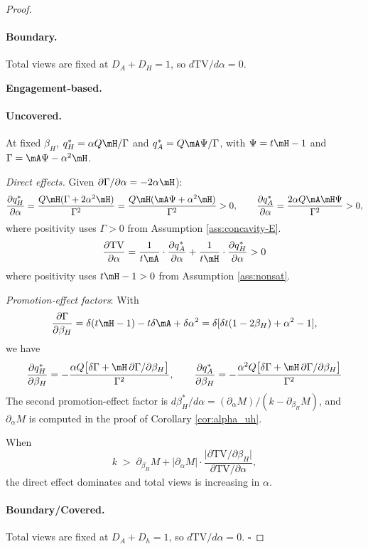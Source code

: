 \begin{proof}
\paragraph{Boundary.}\;
Total views are fixed at $D_A + D_H = 1$, so $d\text{TV}/d\alpha = 0$.



\medskip
\textbf{Engagement-based.}
\paragraph{Uncovered.}\;
At fixed $\beta_H$, $q_H^* = \alpha Q\mH/\Gamma$ and
$q_A^* = Q\mA\Psi/\Gamma$, with $\Psi = t\mH - 1$ and
$\Gamma = \mA\Psi - \alpha^2\mH$.

\emph{Direct effects.} Given $\partial\Gamma/\partial\alpha = -2\alpha\mH$):
\[
\frac{\partial q_H^*}{\partial\alpha}
= \frac{Q\mH(\Gamma + 2\alpha^2\mH)}{\Gamma^2}=
\frac{Q\mH(\mA\Psi +\alpha^2\mH)}{\Gamma^2}> 0,
\qquad
\frac{\partial q_A^*}{\partial\alpha}
= \frac{2\alpha Q\mA\mH\Psi}{\Gamma^2} > 0,
\]
where positivity uses $\Gamma> 0$ from Assumption \ref{ass:concavity-E}.
\[
\frac{\partial\text{TV}}{\partial\alpha} = \frac{1}{t\mA}\cdot\frac{\partial q_A^*}{\partial\alpha} +  \frac{1}{t\mH}\cdot\frac{\partial q_H^*}{\partial\alpha}> 0
\]
where positivity uses $t\mH-1> 0$ from Assumption \ref{ass:nonsat}.

\emph{Promotion-effect factors}: 
With
\[
\frac{\partial\Gamma}{\partial\beta_H} = \delta(t\mH-1)-t\delta\mA +\delta \alpha^2 =  \delta[\delta t(1-2\beta_H) + \alpha^2 - 1],
\]
we have
\[
\frac{\partial q_H^*}{\partial\beta_H}
= -\frac{\alpha Q\bigl[\delta\Gamma + \mH\,\partial\Gamma/\partial\beta_H\bigr]}{\Gamma^2},
\qquad
\frac{\partial q_A^*}{\partial\beta_H}
= -\frac{\alpha^2 Q\bigl[\delta\Gamma + \mH\,\partial\Gamma/\partial\beta_H\bigr]}{\Gamma^2}
\]
The second promotion-effect factor is
$d\beta_H^*/d\alpha = (\partial_\alpha M)/(k -
\partial_{\beta_H}M)$, and  $\partial_\alpha M$ is computed in the proof of Corollary \ref{cor:alpha_uh}.

When
\begin{equation}\label{eq:kbar-alpha-Y-E}
k \;>\; \partial_{\beta_H}M
+ \bigl|\partial_\alpha M\bigr|\cdot
\frac{\bigl|\partial \text{TV}/\partial\beta_H\bigr|}{\partial \text{TV}/\partial\alpha},
\end{equation}
the direct effect dominates and total views is increasing in $\alpha$.


\medskip
\paragraph{Boundary/Covered.}\;
Total views are fixed at $D_A + D_h = 1$, so $d\text{TV}/d\alpha = 0$.
\hfill$\square$
\end{proof}


